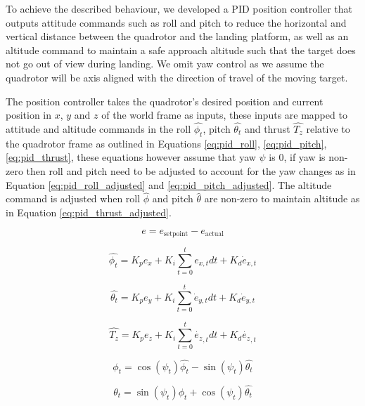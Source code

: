 \documentclass[11pt, twocolumn]{article}
\begin{document}
To achieve the described behaviour, we developed a PID position controller that outputs attitude commands such as roll and pitch to reduce the horizontal and vertical distance between the quadrotor and the landing platform, as well as an altitude command to maintain a safe approach altitude such that the target does not go out of view during landing. We omit yaw control as we assume the quadrotor will be axis aligned with the direction of travel of the moving target. 

The position controller takes the quadrotor's desired position and current position in $x$, $y$ and $z$ of the world frame as inputs, these inputs are mapped to attitude and altitude commands in the roll $\hat{\phi_t}$, pitch $\hat{\theta_t}$ and thrust $\hat{T_z}$ relative to the quadrotor frame as outlined in Equations \ref{eq:pid_roll}, \ref{eq:pid_pitch}, \ref{eq:pid_thrust}, these equations however assume that yaw $\psi$ is 0, if yaw is non-zero then roll and pitch need to be adjusted to account for the yaw changes as in Equation \ref{eq:pid_roll_adjusted} and \ref{eq:pid_pitch_adjusted}. The altitude command is adjusted when roll $\hat{\phi}$ and pitch $\hat{\theta}$ are non-zero to maintain altitude as in Equation \ref{eq:pid_thrust_adjusted}. 

\begin{equation}
	\label{eq:pid_error}
	e = e_{\text{setpoint}} - e_{\text{actual}}
\end{equation}

\begin{equation}
	\label{eq:pid_roll}
	\hat{\phi_t} = K_p e_x + K_i \sum_{t = 0}^{t} e_{x, t} dt + K_d \dot{e}_{x,t}
\end{equation}

\begin{equation}
	\label{eq:pid_pitch}
	\hat{\theta_t} = K_p e_y + K_i \sum_{t = 0}^{t} \dot{e}_{y,t} dt + K_d \dot{e}_{y ,t}
\end{equation}

\begin{equation}
	\label{eq:pid_thrust}
	\hat{T_z} =
		K_p e_z + K_i \sum_{t=0}^{t} \dot{e_z}_{,t} dt + K_d \dot{e_z}_{,t} 
\end{equation}

\begin{equation}
	\label{eq:pid_roll_adjusted}
	\phi_t = \cos(\psi_t) \hat{\phi_t} - \sin(\psi_t) \hat{\theta_t}
\end{equation}

\begin{equation}
	\label{eq:pid_pitch_adjusted}
	\theta_t = \sin(\psi_t) \hat{\phi_t} + \cos(\psi_t) \hat{\theta_t}
\end{equation}
\end{document}
